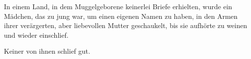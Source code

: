 \later

In einem Land, in dem Muggelgeborene keinerlei Briefe erhielten, wurde ein Mädchen, das zu jung war, um einen eigenen Namen zu haben, in den Armen ihrer verärgerten, aber liebevollen Mutter geschaukelt, bis sie aufhörte zu weinen und wieder einschlief.

\later

Keiner von ihnen schlief gut.

